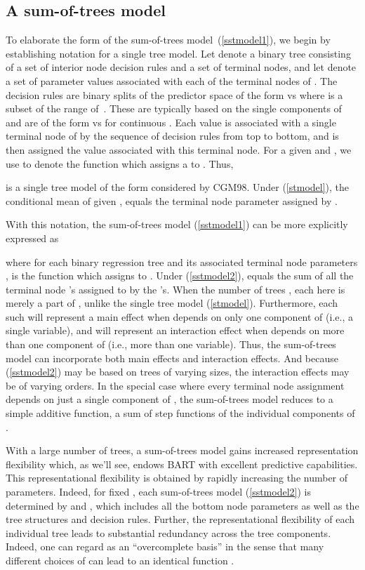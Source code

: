 \documentclass[aoas,nameyear,dvips]{arximspdf}
\begin{document}
\subsection{A sum-of-trees model}

To elaborate the form of the sum-of-trees mod\-el~(\ref{sstmodel1}), we begin by
establishing notation for a single tree model. Let  denote a
binary tree consisting of a set of interior node decision rules
and a set of terminal nodes, and let  denote a set of parameter values
associated with each of the  terminal nodes of . The
decision rules are binary splits of the predictor space of the
form  vs  where  is a subset of
the range of~.  These are typically based on the single components of
 and are of the
form  vs  for continuous .
Each  value is associated with a single
terminal node of  by the sequence of decision rules from top to
bottom, and is then assigned the  value associated with
this terminal node. For a given  and , we use  to
denote the function which assigns a  to .
Thus,

is a single tree model of the form considered by CGM98.  Under (\ref{stmodel}),
the conditional mean of  given ,  equals the
terminal node parameter  assigned by .

With this notation, the sum-of-trees model (\ref{sstmodel1}) can
be more explicitly expressed as

where for each binary regression tree  and its associated terminal node parameters ,  is the function which assigns  to .
Under (\ref{sstmodel2}),   equals the sum of all the terminal node
's assigned to  by the 's.
When the number of trees ,  each  here is merely a part of , unlike the single tree model (\ref{stmodel}).  Furthermore, each such  will represent a main effect when  depends on only one component of  (i.e., a single
variable), and will represent an interaction effect when  depends on more than one component of  (i.e., more than
one variable).  Thus, the sum-of-trees model can incorporate both
main effects and interaction effects.  And because (\ref{sstmodel2})
may be based on trees of varying sizes, the interaction effects may
be of varying orders. In the special case where every terminal node
assignment depends on just a single component of , the
sum-of-trees model reduces to a simple additive function, a sum of step functions of the
individual components of .

With a large number of trees, a sum-of-trees model gains increased
representation flexibility which, as we'll see, endows BART with
excellent predictive capabilities.    This
representational flexibility is obtained by rapidly increasing the
number of parameters. Indeed, for fixed , each sum-of-trees model
(\ref{sstmodel2}) is determined by  and
, which includes all the bottom node parameters as well as
the tree structures and decision rules.  Further, the
representational flexibility of each individual tree leads to
substantial redundancy across the tree components. Indeed, one can
regard  as an ``overcomplete
basis'' in the sense that many different choices of  can lead to an identical function .
\end{document}
